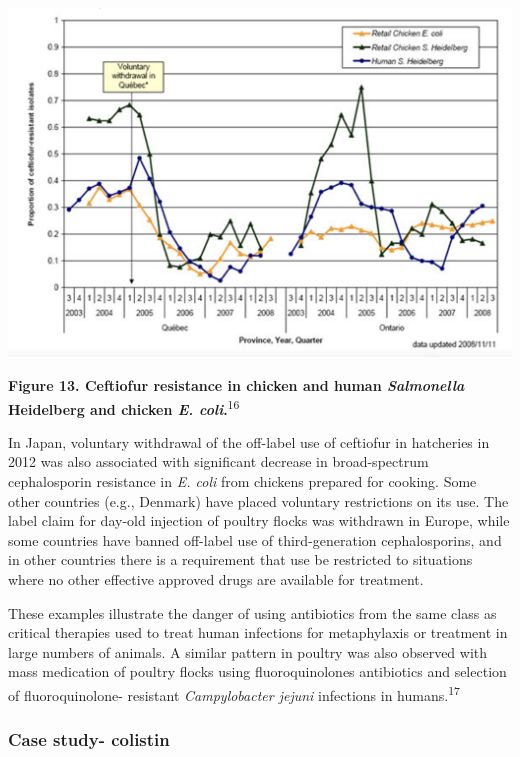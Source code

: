 \documentclass[
]{book}
\begin{document}
\includegraphics[width=7.29167in,height=\textheight]{images/Canada_ecoli.png}

\textbf{Figure 13. Ceftiofur resistance in chicken and human \emph{Salmonella} Heidelberg and chicken \emph{E. coli}.}\textsuperscript{16}

In Japan, voluntary withdrawal of the off-label use of ceftiofur in hatcheries in 2012 was also associated with significant decrease in broad-spectrum cephalosporin resistance in \emph{E. coli} from chickens prepared for cooking. Some other countries (e.g., Denmark) have placed voluntary restrictions on its use. The label claim for day-old injection of poultry flocks was withdrawn in Europe, while some countries have banned off-label use of third-generation cephalosporins, and in other countries there is a requirement that use be restricted to situations where no other effective approved drugs are available for treatment.

These examples illustrate the danger of using antibiotics from the same class as critical therapies used to treat human infections for metaphylaxis or treatment in large numbers of animals. A similar pattern in poultry was also observed with mass medication of poultry flocks using fluoroquinolones antibiotics and selection of fluoroquinolone- resistant \emph{Campylobacter jejuni} infections in humans.\textsuperscript{17}

\hypertarget{case-study--colistin}{%
\subsubsection*{Case study- colistin}\label{case-study--colistin}}
\end{document}
